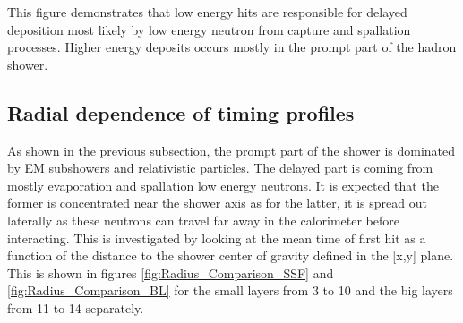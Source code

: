 This figure demonstrates that low energy hits are responsible for delayed deposition most likely by low energy neutron from capture and spallation processes. Higher energy deposits occurs mostly in the prompt part of the hadron shower.

\subsection{Radial dependence of timing profiles}

As shown in the previous subsection, the prompt part of the shower is dominated by EM subshowers and relativistic particles. The delayed part is coming from mostly evaporation and spallation low energy neutrons. It is expected that the former is concentrated near the shower axis as for the latter, it is spread out laterally as these neutrons can travel far away in the calorimeter before interacting. This is investigated by looking at the mean time of first hit as a function of the distance to the shower center of gravity defined in the [x,y] plane. This is shown in figures \ref{fig:Radius_Comparison_SSF} and \ref{fig:Radius_Comparison_BL} for the small layers from 3 to 10 and the big layers from 11 to 14 separately.

